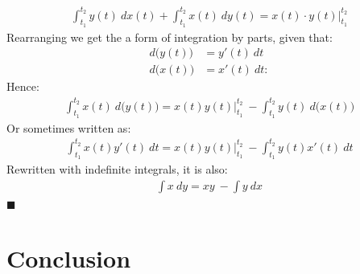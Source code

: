 \documentclass[11pt,a4paper]{article}
\newcommand{\qed}{\hfill $\blacksquare$}
\begin{document}
\begin{align*}
\int_{t_1}^{t_2} y(t) \ dx(t) + \int_{t_1}^{t_2} x(t) \ dy(t) = x(t)\cdot y(t) \Big|_{t_1}^{t_2} 
\end{align*}
Rearranging we get the a form of integration by parts, given that: \begin{align*}
d\big( y(t) \big) &= y'(t)\ dt \\
d\big(x(t)\big) &= x'(t)\ dt:
\end{align*}
Hence:
\begin{align*}
\int_{t_1}^{t_2} x(t) \ d\big(y(t)\big) = x(t)y(t) \Big|_{t_1}^{t_2} \ - \int_{t_1}^{t_2} y(t) \ d\big(x(t)\big)
\end{align*}
Or sometimes written as:
\begin{align*}
\int_{t_1}^{t_2} x(t)y'(t) \ dt = x(t)y(t) \Big|_{t_1}^{t_2} \ - \int_{t_1}^{t_2} y(t)x'(t)\ dt
\end{align*}
Rewritten with indefinite integrals, it is also:
\begin{align*}
\int x\ dy = xy \ - \int y \ dx 
\end{align*}
\qed

\section{Conclusion}
\end{document}
